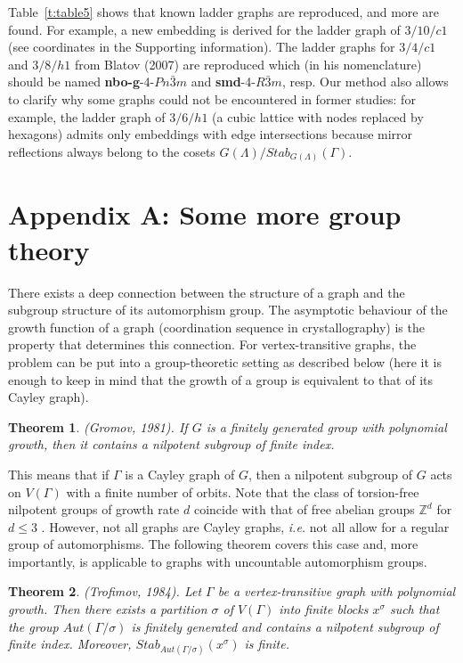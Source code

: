 \documentclass[11pt,a4paper]{article}
\newtheorem{theorem}{Theorem}
\newcommand{\Z}{\mathbb Z}
\begin{document}
Table~\ref{t:table5} shows that known ladder graphs are reproduced, and more are found. For example, a new embedding is derived for the ladder graph of $3/10/c1$ (see coordinates in the Supporting information). The ladder graphs for $3/4/c1$ and $3/8/h1$ from Blatov (2007) \cite{Blatov07} are reproduced which (in his nomenclature) should be named {\bf nbo-g}-4-$Pn\bar3m$ and {\bf smd}-4-$R\bar3m$, resp. Our method also allows to clarify why some graphs could not be encountered in former studies: for example, the ladder graph of $3/6/h1$ (a cubic lattice with nodes replaced by hexagons) admits only embeddings with edge intersections because mirror reflections always belong to the cosets $G(\Lambda)/Stab_{G(\Lambda)}(\Gamma)$.

\section{Appendix A: Some more group theory}

There exists a deep connection between the structure of a graph and the subgroup structure of its automorphism group. The asymptotic behaviour of the growth function of a graph (coordination sequence in crystallography) is the property that determines this connection. For vertex-transitive graphs, the problem can be put into a group-theoretic setting as described below (here it is enough to keep in mind that the growth of a group is equivalent to that of its Cayley graph).

\begin{theorem}
\label{teo3}
\emph{(Gromov, 1981)}. If $G$ is a finitely generated group with polynomial growth, then it contains a nilpotent subgroup of finite index.
\end{theorem}

\noindent This means that if $\Gamma$ is a Cayley graph of $G$, then a nilpotent subgroup of $G$ acts on $V(\Gamma)$ with a finite number of orbits. Note that the class of torsion-free nilpotent groups of growth rate $d$ coincide with that of free abelian groups $\Z^d$ for $d \leq 3$ \cite{Seif97}. However, not all graphs are Cayley graphs, \emph{i.e.} not all allow for a regular group of automorphisms. The following theorem covers this case and, more importantly, is applicable to graphs with uncountable automorphism groups.

\begin{theorem}
\label{teo4}
\emph{(Trofimov, 1984)}. Let $\Gamma$ be a vertex-transitive graph with polynomial growth. Then there exists a partition $\sigma$ of $V(\Gamma)$ into finite blocks $x^\sigma$ such that the group $Aut(\Gamma/\sigma)$ is finitely generated and contains a nilpotent subgroup of finite index. Moreover, $Stab_{Aut(\Gamma/\sigma)}(x^\sigma)$ is finite.
\end{theorem}
\end{document}
